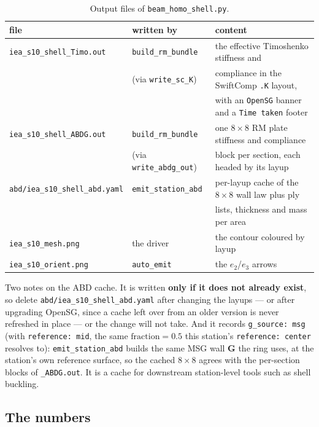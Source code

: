 \begin{table}[htbp]
\centering
\small
\begin{tabular}{lll}
\toprule
file & written by & content \\
\midrule
\texttt{iea\_s10\_shell\_Timo.out} & \texttt{build\_rm\_bundle} & the effective Timoshenko stiffness and \\
                                   & (via \texttt{write\_sc\_K}) & compliance in the SwiftComp \texttt{.K} layout, \\
                                   & & with an \texttt{OpenSG} banner and a \texttt{Time taken} footer \\
\texttt{iea\_s10\_shell\_ABDG.out} & \texttt{build\_rm\_bundle} & one $8\times8$ RM plate stiffness and compliance \\
                                   & (via \texttt{write\_abdg\_out}) & block per section, each headed by its layup \\
\texttt{abd/iea\_s10\_shell\_abd.yaml} & \texttt{emit\_station\_abd} & per-layup cache of the $8\times8$ wall law plus ply \\
                                   & & lists, thickness and mass per area \\
\texttt{iea\_s10\_mesh.png} & the driver & the contour coloured by layup \\
\texttt{iea\_s10\_orient.png} & \texttt{auto\_emit} & the $e_2$/$e_3$ arrows \\
\bottomrule
\end{tabular}
\caption{Output files of \texttt{beam\_homo\_shell.py}.}
\label{tab:shell-beam-outputs}
\end{table}

Two notes on the ABD cache. It is written \textbf{only if it does not already
exist}, so delete \texttt{abd/iea\_s10\_shell\_abd.yaml} after changing the
layups --- or after upgrading OpenSG, since a cache left over from an older
version is never refreshed in place --- or the change will not take. And it
records \texttt{g\_source: msg} (with \texttt{reference: mid}, the same
$\mathrm{fraction} = 0.5$ this station's \texttt{reference: center} resolves
to): \texttt{emit\_station\_abd} builds the same MSG wall $\mathbf{G}$ the ring
uses, at the station's own reference surface, so the cached $8\times8$ agrees
with the per-section blocks of \texttt{\_ABDG.out}. It is a cache for downstream
station-level tools such as shell buckling.

\subsection{The numbers}

